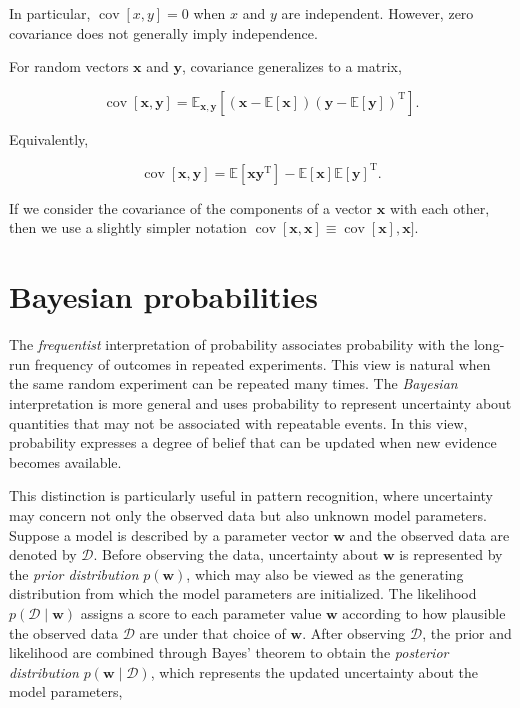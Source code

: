 \documentclass[10pt,twocolumn]{memoir}
\begin{document}
In particular, $\operatorname{cov}[x,y]=0$ when $x$ and $y$ are independent. However, zero covariance does not generally imply independence.

For random vectors $\mathbf{x}$ and $\mathbf{y}$, covariance generalizes to a matrix,

\begin{equation}
    \operatorname{cov}[\mathbf{x},\mathbf{y}] = \mathbb{E}_{\mathbf{x},\mathbf{y}}\left[\left(\mathbf{x}-\mathbb{E}[\mathbf{x}]\right)\left(\mathbf{y}-\mathbb{E}[\mathbf{y}]\right)^{\mathrm{T}}\right].
\end{equation}

Equivalently,

\begin{equation}
    \operatorname{cov}[\mathbf{x},\mathbf{y}] = \mathbb{E}[\mathbf{x}\mathbf{y}^{\mathrm{T}}] - \mathbb{E}[\mathbf{x}]\mathbb{E}[\mathbf{y}]^{\mathrm{T}}.
\end{equation}

If we consider the covariance of the components of a vector $\mathbf{x}$ with each other, then we use a slightly simpler notation $\operatorname{cov}[\mathbf{x}, \mathbf{x}] \equiv \operatorname{cov}[\mathbf{x}], \mathbf{x}]$.

\section{Bayesian probabilities}

The \textit{frequentist} interpretation of probability associates probability with the long-run frequency of outcomes in repeated experiments. This view is natural when the same random experiment can be repeated many times. The \textit{Bayesian} interpretation is more general and uses probability to represent uncertainty about quantities that may not be associated with repeatable events. In this view, probability expresses a degree of belief that can be updated when new evidence becomes available.

This distinction is particularly useful in pattern recognition, where uncertainty may concern not only the observed data but also unknown model parameters. Suppose a model is described by a parameter vector $\mathbf{w}$ and the observed data are denoted by $\mathcal{D}$. Before observing the data, uncertainty about $\mathbf{w}$ is represented by the \textit{prior distribution} $p(\mathbf{w})$, which may also be viewed as the generating distribution from which the model parameters are initialized. The likelihood $p(\mathcal{D}\mid\mathbf{w})$ assigns a score to each parameter value $\mathbf{w}$ according to how plausible the observed data $\mathcal{D}$ are under that choice of $\mathbf{w}$. After observing $\mathcal{D}$, the prior and likelihood are combined through Bayes' theorem to obtain the \textit{posterior distribution} $p(\mathbf{w}\mid\mathcal{D})$, which represents the updated uncertainty about the model parameters,
\end{document}
